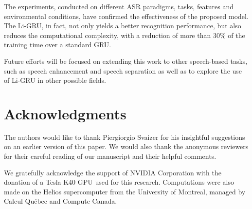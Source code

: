 \documentclass[journal]{IEEEtran}
\begin{document}
The experiments, conducted on different ASR paradigms, tasks, features and environmental conditions, have confirmed the effectiveness of the proposed model. The Li-GRU, in fact, not only yields a better recognition performance, but also reduces the computational complexity, with a reduction of more than 30\% of the training time over a standard GRU.

Future efforts will be focused on extending this work to other speech-based tasks, such as speech enhancement and speech separation as well as to explore the use of Li-GRU in other possible fields.%



%
%

 \section*{Acknowledgments}
 The authors would like to thank Piergiorgio Svaizer for his insightful suggestions on an earlier version of this paper. We would also thank the anonymous reviewers for their careful reading of our manuscript and their helpful comments.

We gratefully acknowledge the support of NVIDIA Corporation with the donation of a Tesla K40 GPU used for this research. Computations were also made on the Helios supercomputer from the University of Montreal, managed by Calcul Québec and Compute Canada.




\end{document}

